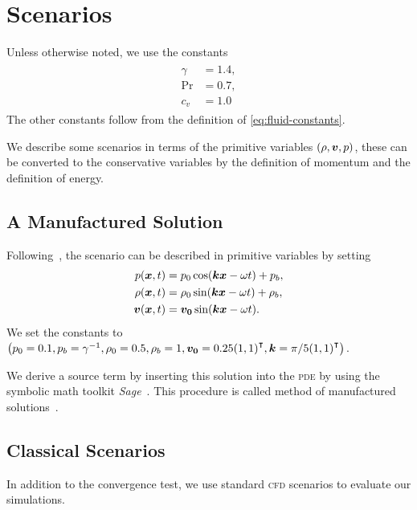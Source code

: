 \chapter{Scenarios}\label{sec:scenarios}
Unless otherwise noted, we use the constants
\begin{align}
\begin{split}
  \gamma &= 1.4, \\
  \Pr &= 0.7, \\
  c_v &= 1.0
\end{split}
\end{align}
The other constants follow from the definition of \cref{eq:fluid-constants}.

We describe some scenarios in terms of the primitive variables $(\rho, \bm{v}, p)$, these can be converted to the conservative variables by the definition of momentum and the definition of energy.   
\section{A Manufactured Solution}\label{sec:manufactured-solution}
Following~\cite{dumbser2010arbitrary}, the scenario can be described in primitive variables by setting
\begin{align}
\begin{split}
  p(\bm{x}, t) &= p_0 \cos( \bm{k} \bm{x} - \omega t ) + p_b, \\
  \rho(\bm{x}, t) &= \rho_0 \sin (\bm{k} \bm{x} - \omega t) + \rho_b, \\
  \bm{v}(\bm{x}, t) &= \bm{v_0} \sin(\bm{k} \bm{x} - \omega t).
\end{split}
\end{align}
We set the constants to \( \left(  p_0 = 0.1, p_b = \gamma^{-1}, \rho_0 = 0.5, \rho_b = 1, 
\bm{v_0} = 0.25 {(1,1)}^\intercal, \bm{k} = \pi/5 {(1,1)}^\intercal \right) \).

We derive a source term by inserting this solution into the \textsc{pde} by using the symbolic math toolkit \textit{Sage}~\cite{sagemath}.
This procedure is called method of manufactured solutions~\cite{salari2000code}.

\section{Classical Scenarios}
In addition to the convergence test, we use standard \textsc{cfd} scenarios to evaluate our simulations.



